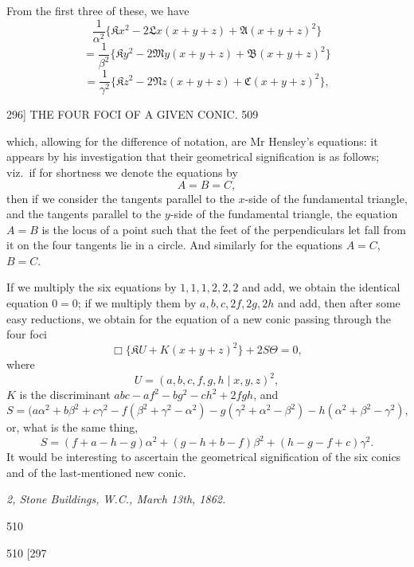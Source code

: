 \documentclass[11pt]{article}
\begin{document}
From the first three of these, we have
\[ \frac{1}{\alpha^{2}}\{\mathfrak{K}x^{2}-2\mathfrak{L}x(x+y+z)+\mathfrak{A}(x+y+z)^{2}\} \]
\[ = \frac{1}{\beta^{2}}\{\mathfrak{K}y^{2}-2\mathfrak{M}y(x+y+z)+\mathfrak{B}(x+y+z)^{2}\} \]
\[ = \frac{1}{\gamma^{2}}\{\mathfrak{K}z^{2}-2\mathfrak{N}z(x+y+z)+\mathfrak{C}(x+y+z)^{2}\}, \]

\newpage
\begin{center}
296] \hfill THE FOUR FOCI OF A GIVEN CONIC. \hfill 509
\end{center}

which, allowing for the difference of notation, are Mr Hensley's equations: it appears by his investigation that their geometrical signification is as follows; viz.\ if for shortness we denote the equations by
\[ A=B=C, \]
then if we consider the tangents parallel to the $x$-side of the fundamental triangle, and the tangents parallel to the $y$-side of the fundamental triangle, the equation $A=B$ is the locus of a point such that the feet of the perpendiculars let fall from it on the four tangents lie in a circle. And similarly for the equations $A=C$, $B=C$.

If we multiply the six equations by $1,1,1,2,2,2$ and add, we obtain the identical equation $0=0$; if we multiply them by $a,b,c,2f,2g,2h$ and add, then after some easy reductions, we obtain for the equation of a new conic passing through the four foci
\[ \Box\{\mathfrak{K}U+K(x+y+z)^{2}\}+2S\Theta=0, \]
where
\[ U=(a,b,c,f,g,h \mid x,y,z)^{2}, \]
$K$ is the discriminant $abc-af^{2}-bg^{2}-ch^{2}+2fgh$, and
\[ S=(a\alpha^{2}+b\beta^{2}+c\gamma^{2}-f(\beta^{2}+\gamma^{2}-\alpha^{2})-g(\gamma^{2}+\alpha^{2}-\beta^{2})-h(\alpha^{2}+\beta^{2}-\gamma^{2}), \]
or, what is the same thing,
\[ S=(f+a-h-g)\alpha^{2}+(g-h+b-f)\beta^{2}+(h-g-f+c)\gamma^{2}. \]
It would be interesting to ascertain the geometrical signification of the six conics and of the last-mentioned new conic.

\medskip
\noindent\emph{2, Stone Buildings, W.C., March 13th, 1862.}

\vfill
\begin{flushright}\small 510\end{flushright}

\newpage
\begin{center}
510 \hfill\hfill [297
\end{center}
\end{document}
